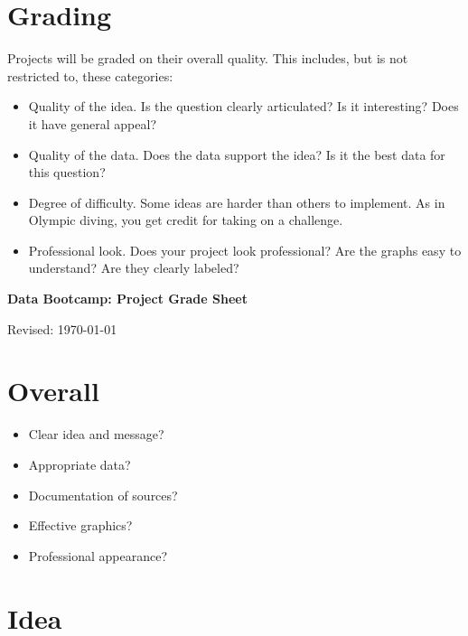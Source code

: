 \documentclass[11pt]{article}
\begin{document}
\section*{Grading}

Projects will be graded on their overall quality.  This includes, but is not restricted to,
these categories:
%
\begin{itemize}
\item Quality of the idea.  Is the question clearly articulated?  Is it interesting?
Does it have general appeal?
\item Quality of the data.  Does the data support the idea?
Is it the best data for this question?
\item Degree of difficulty.  Some ideas are harder than others to implement.
As in Olympic diving, you get credit for taking on a challenge.
\item Professional look.  Does your project look professional?  Are the graphs
easy to understand?  Are they clearly labeled?
\end{itemize}





\pagebreak
\thispagestyle{empty}


\bigskip\bigskip
\centerline{\Large \bf Data Bootcamp:  Project Grade Sheet}
\centerline{Revised: \today}


\section*{Overall}

\begin{itemize} %
\item Clear idea and message?
\item Appropriate data?
\item Documentation of sources?
\item Effective graphics?
\item Professional appearance?
\end{itemize}
\bigskip

\section*{Idea}

\vspace*{0.75in}

\end{document}
